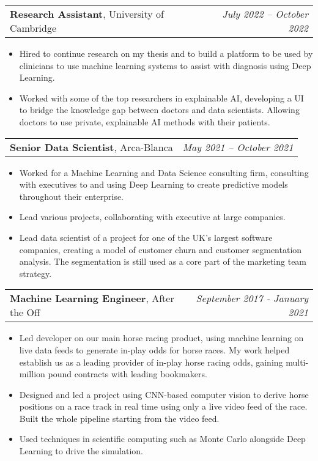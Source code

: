 \documentclass[letterpaper,11pt]{article}
\makeatletter
\newcommand{\CVItem}[1]{
  \item{
    {#1 \vspace{0pt}}
  }
}
\newcommand{\CVSubHeading}[4]{
  \vspace{4pt}\item
    \begin{tabular*}{0.985\textwidth}[t]{l@{\extracolsep{\fill}}r}
      \textbf{#1}, {#3} & \textit{#4} \\
    \end{tabular*}\vspace{-3pt}
}
\newcommand{\CVItemListStart}{\begin{itemize}}
\newcommand{\CVItemListEnd}{\end{itemize}\vspace{-3pt}}
\makeatother
\begin{document}
    \CVSubHeading{Research Assistant}{}{University of Cambridge}{July 2022 – October 2022}
        \CVItemListStart
            \CVItem{
                Hired to continue research on my thesis and to build a platform to be used by clinicians to use machine learning systems to assist with diagnosis using Deep Learning.
            }
            \CVItem{
                Worked with some of the top researchers in explainable AI, developing a UI to bridge the knowledge gap between doctors and data scientists. Allowing doctors to use private, explainable AI methods with their patients.
            }
        \CVItemListEnd

    \CVSubHeading{Senior Data Scientist}{}{Arca-Blanca}{May 2021 – October 2021}
        \CVItemListStart
            \CVItem{
                Worked for a Machine Learning and Data Science consulting firm, consulting with executives to and using Deep Learning to create predictive models throughout their enterprise.
            }
            \CVItem{
                Lead various projects, collaborating with executive at large companies.
            }
            \CVItem{
                Lead data scientist of a project for one of the UK's largest software companies, creating a model of customer churn and customer segmentation analysis. The segmentation is still used as a core part of the marketing team strategy. 
            }
        \CVItemListEnd

    \CVSubHeading{Machine Learning Engineer}{}{After the Off}{September 2017 - January 2021}
        \CVItemListStart
            \CVItem{
                Led developer on our main horse racing product, using machine learning on live data feeds to generate in-play odds for horse races. My work helped establish us as a leading provider of in-play horse racing odds, gaining multi-million pound contracts with leading bookmakers.
            }
            \CVItem{
                Designed and led a project using CNN-based computer vision to derive horse positions on a race track in real time using only a live video feed of the race. Built the whole pipeline starting from the video feed.
            }
            \CVItem{
                Used techniques in scientific computing such as Monte Carlo alongside Deep Learning to drive the simulation.
            }
        \CVItemListEnd
\end{document}
